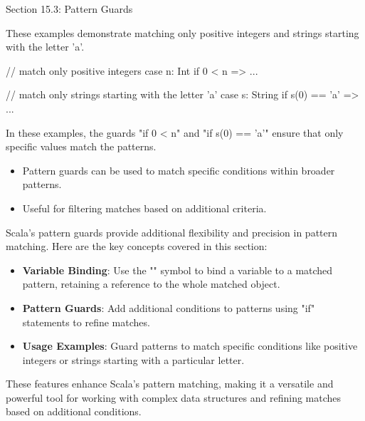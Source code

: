 \begin{notes}{Section 15.3: Pattern Guards}
    \begin{highlight}
    
        These examples demonstrate matching only positive integers and strings starting with the letter 'a'.
    
    \begin{code}[Scala]
    // match only positive integers
    case n: Int if 0 < n => ...
    
    // match only strings starting with the letter 'a'
    case s: String if s(0) == 'a' => ...
    \end{code}
    
        In these examples, the guards "if 0 < n" and "if s(0) == 'a'" ensure that only specific values match the patterns.
    
        \begin{itemize}
            \item Pattern guards can be used to match specific conditions within broader patterns.
            \item Useful for filtering matches based on additional criteria.
        \end{itemize}
    
    \end{highlight}
    
    \begin{highlight}
    
        Scala's pattern guards provide additional flexibility and precision in pattern matching. Here are the key concepts covered in this section:
    
        \begin{itemize}
            \item \textbf{Variable Binding}: Use the "\@" symbol to bind a variable to a matched pattern, retaining a reference to the whole matched object.
            \item \textbf{Pattern Guards}: Add additional conditions to patterns using "if" statements to refine matches.
            \item \textbf{Usage Examples}: Guard patterns to match specific conditions like positive integers or strings starting with a particular letter.
        \end{itemize}
    
        These features enhance Scala's pattern matching, making it a versatile and powerful tool for working with complex data structures and refining matches based on additional conditions.
    
    \end{highlight}
\end{notes}

